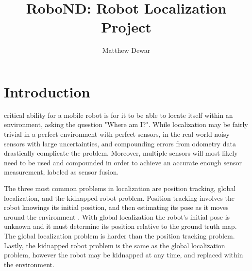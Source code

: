 \documentclass[10pt,journal,compsoc]{IEEEtran}
\begin{document}
\title{RoboND: Robot Localization Project}

\author{Matthew Dewar}

%
{}


\maketitle
\IEEEdisplaynontitleabstractindextext
\IEEEpeerreviewmaketitle
\section{Introduction}
\label{sec:introduction}

 critical ability for a mobile robot is for it to be able to locate itself within an environment, asking the question "Where am I?". While localization may be fairly trivial in a perfect environment with perfect sensors, in the real world noisy sensors with large uncertainties, and compounding errors from odometry data drastically complicate the problem. Moreover, multiple sensors will most likely need to be used and compounded in order to achieve an accurate enough sensor measurement, labeled as sensor fusion.

The three most common problems in localization are position tracking, global localization, and the kidnapped robot problem. Position tracking involves the robot knowings its initial position, and then estimating its pose as it moves around the environment \cite{UdacityLesson9}. With global localization the robot's initial pose is unknown and it must determine its position relative to the ground truth map. The global localization problem is harder than the position tracking problem. Lastly, the kidnapped robot problem is the same as the global localization problem, however the robot may be kidnapped at any time, and replaced within the environment.
\end{document}
